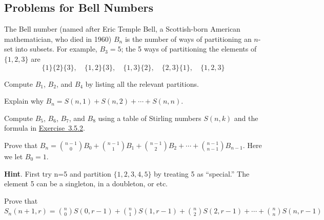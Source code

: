 \documentclass[10pt,]{book}
\theoremstyle{plain}
\theoremstyle{definition}
\theoremstyle{definition}
\theoremstyle{definition}
\theoremstyle{definition}
\numberwithin{equation}{chapter}
\begin{document}
\subsection*{Problems for Bell Numbers}\label{exercises-10}
\hypertarget{p-1250}{}%
The Bell number (named after Eric Temple Bell, a Scottish-born American mathematician, who died in 1960) \(B_{n}\) is the number of ways of partitioning an \(n\)-set into subsets. For example, \(B_{3} = 5\); the 5  ways of partitioning the elements of \(\{1, 2, 3\}\) are%
\begin{equation*}
\{1\} \{2\} \{3\},\quad \{1, 2\} \{3\},\quad  \{1, 3\} \{2\}, \quad \{2, 3\} \{1\}, \quad \{1, 2, 3\}
\end{equation*}
%
\begin{divisionexercise}{1}\hypertarget{exercise-115}{}
\hypertarget{p-1251}{}%
Compute \(B_{1}\), \(B_{2}\), and \(B_{4}\) by listing all the relevant partitions.%
\end{divisionexercise}%
\begin{divisionexercise}{2}\hypertarget{ex-bell-as-stirlings}{}
\hypertarget{p-1252}{}%
Explain why \(B_{n} = S\left( n,1 \right) + S\left( n,2 \right) + \cdots + S(n,n)\).%
\end{divisionexercise}%
\begin{divisionexercise}{3}\hypertarget{exercise-117}{}
\hypertarget{p-1253}{}%
Compute \(B_{5}\), \(B_{6}\), \(B_{7}\), and \(B_{8}\) using a table of Stirling numbers \(S(n,k)\) and the formula in \hyperlink{ex-bell-as-stirlings}{Exercise~3.5.2}.%
\end{divisionexercise}%
\begin{divisionexercise}{4}\hypertarget{ex-bell-recurrence}{}
\hypertarget{p-1254}{}%
Prove that \(B_{n} =  \binom{n - 1}{0} B_{0} + \binom{n - 1}{1} B_{1} + \binom{n - 1}{2} B_{2} + \cdots + \binom{n - 1}{n - 1} B_{n - 1}\).  Here we let \(B_0 = 1\).%
\par\smallskip%
\noindent\textbf{Hint}.\hypertarget{hint-90}{}\quad%
\hypertarget{p-1255}{}%
First try n=5 and partition \(\{ 1,2,3,4,5\}\) by treating 5 as ``special.'' The element 5 can be a singleton, in a doubleton, or etc.%
\end{divisionexercise}%
\begin{divisionexercise}{5}\hypertarget{ex-stirling-recurrence}{}
\hypertarget{p-1256}{}%
Prove that \(S_{n}(n + 1, r) = \binom{n}{0} S(0, r - 1) + \binom{n}{1} S(1, r - 1) + \binom{n}{2} S(2, r - 1) + \cdots + \binom{n}{n} S(n, r - 1)\)%
\end{divisionexercise}%
\end{document}
